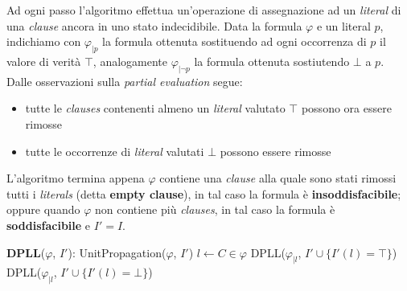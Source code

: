 Ad ogni passo l'algoritmo effettua un'operazione di assegnazione ad un \textit{literal} di una \textit{clause} ancora in uno stato indecidibile. Data la formula $\varphi$ e un literal $p$, indichiamo con $\varphi_{|p}$ la formula ottenuta sostituendo ad ogni occorrenza di $p$ il valore di verità $\top$, analogamente $\varphi_{|\lnot p}$ la formula ottenuta sostiutendo $\bot$ a $p$. Dalle osservazioni sulla \textit{partial evaluation} segue:
\begin{itemize}
\item tutte le \textit{clauses} contenenti almeno un \textit{literal} valutato $\top$ possono ora essere rimosse
\item tutte le occorrenze di \textit{literal} valutati $\bot$ possono essere rimosse
\end{itemize}

L'algoritmo termina appena $\varphi$ contiene una \textit{clause} alla quale sono stati rimossi tutti i \textit{literals} (detta \textbf{empty clause}), in tal caso la formula è \textbf{insoddisfacibile}; oppure quando $\varphi$ non contiene più \textit{clauses}, in tal caso la formula è \textbf{soddisfacibile} e $I' = I$.\\

\begin{mdframed}
\begin{algorithm}[H]
 \DontPrintSemicolon
 \;
 \textbf{DPLL}($\varphi$, $I'$):\;
 UnitPropagation($\varphi$, $I'$)\;
 $l \leftarrow C \in \varphi$\;
 DPLL($\varphi_{|l}$, $I' \cup \lbrace I'(l) = \top \rbrace$)\;
 DPLL($\varphi_{|l}$, $I' \cup \lbrace I'(l) = \bot \rbrace$)\; 
\end{algorithm}
\end{mdframed}